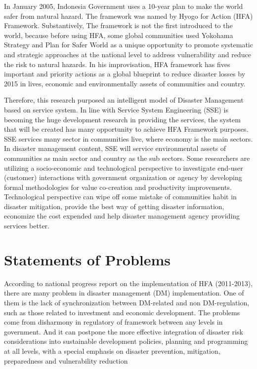 In January 2005\cite{HFAConference}, Indonesia Government uses a 10-year plan to make the world safer from natural hazard. The framework was named by Hyogo for Action (HFA) Framework. Substantively, The framework is not the first introduced to the world, because before using HFA, some global communities used Yokohama Strategy and Plan for Safer World as a unique opportunity to promote systematic and strategic approaches at the national level to address vulnerability and reduce the risk to natural hazards. In his improvisation, HFA framework has fives important and priority actions as a global blueprint to reduce disaster losses by 2015 in lives, economic and environmentally assets of communities and country.\par
Therefore, this research purposed an intelligent model of Disaster Management based on service system. In line with Service System Engineering (SSE) is becoming the huge development research in providing the services, the system that will be created has many opportunity to achieve HFA Framework purposes. SSE services many sector in communities live, where economy is the main sectors. In disaster management content, SSE will service environmental assets of communities as main sector and country as the sub sectors. Some researchers are utilizing a socio-economic and technological perspective to investigate end-user (customer) interactions with government organization or agency by developing formal methodologies for value co-creation and productivity improvements\cite{Lopes2013}. Technological perspective can wipe off some mistake of communities habit in disaster mitigation, provide the best way of getting disaster information, economize the cost expended and help disaster management agency providing services better.\par

\section{Statements of Problems}
\label{sec:StateOfProblem}
According to national progress report on the implementation of HFA (2011-2013)\cite{Framework2013}, there are many problem in disaster management (DM) implementation. One of them is the lack of synchronization between DM-related and non DM-regulation, such as those related to investment and economic development. The problems come from disharmony in regulatory of framework between any levels in government. And it can postpone the  more effective integration of disaster risk considerations into sustainable development policies, planning and programming at all levels, with a special emphasis on disaster prevention, mitigation, preparedness and vulnerability reduction\par
\begin{comment}
	masalah yangmuncul:
	1. Rendahnya proses sinkronisasi DM-related and non DM-Regulation ... apa itu DM related dan regulation,,, contohnya dalam investment dan ekonomi
	emphasis = penekanan

\end{comment}

